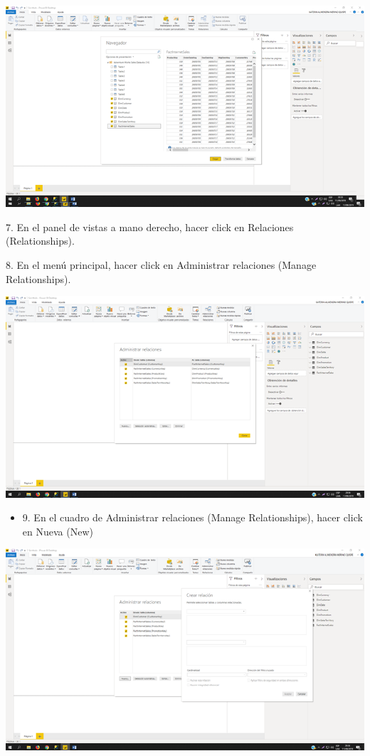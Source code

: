 \begin{center}
\includegraphics[width=15cm]{./Imagenes/img03} 
\end{center}

\item 7. En el panel de vistas a mano derecho, hacer click en Relaciones (Relationships).
\item 8. En el menú principal, hacer click en Administrar relaciones (Manage Relationships).
\begin{center}
\includegraphics[width=15cm]{./Imagenes/img04} 
\end{center}


\begin{itemize}
\item 9. En el cuadro de Administrar relaciones (Manage Relationships), hacer click en Nueva (New)
\end{itemize}

\begin{center}
\includegraphics[width=15cm]{./Imagenes/img05} 
\end{center}

